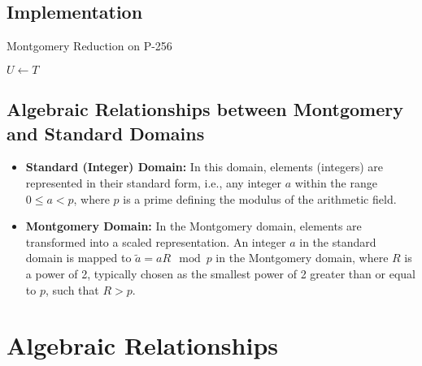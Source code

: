 \subsection{Implementation}
\begin{algorithm}[H]
	\DontPrintSemicolon
	\caption{Montgomery Reduction on P-256}
	\BlankLine
	\BlankLine
	\BlankLine
	$U\gets T$
\end{algorithm}

\newpage
\subsection{Algebraic Relationships between Montgomery and Standard Domains}

\begin{itemize}
\item \textbf{Standard (Integer) Domain:} In this domain, elements (integers) are represented in their standard form, i.e., any integer $a$ within the range $0 \leq a < p$, where $p$ is a prime defining the modulus of the arithmetic field.
\item \textbf{Montgomery Domain:} In the Montgomery domain, elements are transformed into a scaled representation. An integer $a$ in the standard domain is mapped to $\widetilde{a} = aR \mod p$ in the Montgomery domain, where $R$ is a power of 2, typically chosen as the smallest power of 2 greater than or equal to $p$, such that $R > p$.
\end{itemize}

\section*{Algebraic Relationships}

